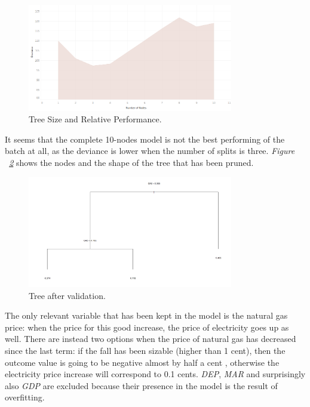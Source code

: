\documentclass[a4paper,12pt]{book}
\begin{document}
\begin{figure}[tb]
\begin{center}
\captionsetup{justification=centering}
\includegraphics[width=0.8\textwidth]{Images/tre.png}
\caption{Tree Size and Relative Performance.}
\label{fig:tre}
\end{center}
\end{figure}

It seems that the complete 10-nodes model is not the best performing of the batch at all, as the deviance is lower when the number of splits is three. \textit{Figure ~\ref{fig:trep}} shows the nodes and the shape of the tree that has been pruned.

\begin{figure}[tb]
\begin{center}
\captionsetup{justification=centering}
\includegraphics[width=0.8\textwidth]{Images/trep.png}
\caption{Tree after validation.}
\label{fig:trep}
\end{center}
\end{figure}

The only relevant variable that has been kept in the model is the natural gas price: when the price for this good increase, the price of electricity goes up as well. There are instead two options when the price of natural gas has decreased since the last term: if the fall has been sizable (higher than 1 cent), then the outcome value is going to be negative almost by half a cent , otherwise the electricity price increase will correspond to 0.1 cents. \textit{DEP}, \textit{MAR} and surprisingly also \textit{GDP} are excluded because their presence in the model is the result of overfitting.\\
\end{document}
